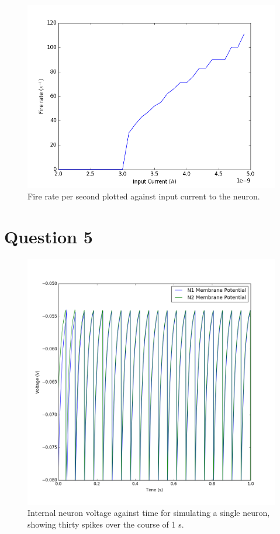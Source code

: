 \documentclass[12pt, a4paper]{article}
\begin{document}
\begin{figure}[H]
  \centering
  \includegraphics[width=1\linewidth]{figures/q4}
  \caption{Fire rate per second plotted against input current to the neuron.}
\end{figure}

\section*{Question 5}

\begin{figure}[H]
  \centering
  \includegraphics[width=1\linewidth]{figures/q5a}
  \caption{Internal neuron voltage against time for simulating a single neuron, showing thirty spikes over the course of 1 s.}
\end{figure}
\end{document}
